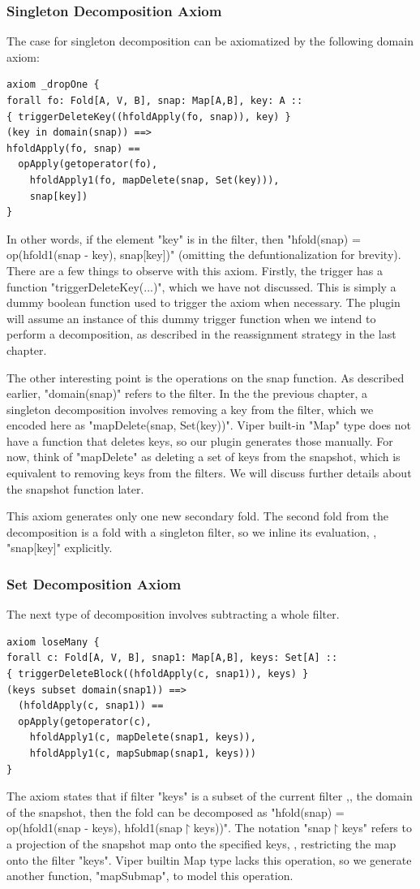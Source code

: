 \documentclass[msc,oneside]{ubcthesis}
\theoremstyle{definition}
\begin{document}
\subsubsection{Singleton Decomposition Axiom}
The case for singleton decomposition can be axiomatized by the following domain axiom:
\begin{lstlisting}[label=axm:drpone,caption=Decomposition By Removing 1 Element]
axiom _dropOne {
forall fo: Fold[A, V, B], snap: Map[A,B], key: A ::
{ triggerDeleteKey((hfoldApply(fo, snap)), key) }
(key in domain(snap)) ==>
hfoldApply(fo, snap) == 
  opApply(getoperator(fo), 
    hfoldApply1(fo, mapDelete(snap, Set(key))), 
    snap[key])
}
\end{lstlisting}
In other words, if the element "key" is in the filter, then "hfold(snap) = op(hfold1(snap - key), snap[key])" (omitting the defuntionalization for brevity). There are a few things to observe with this axiom. Firstly, the trigger has a function "triggerDeleteKey(...)", which we have not discussed. This is simply a dummy boolean function used to trigger the axiom when necessary. The plugin will assume an instance of this dummy trigger function when we intend to perform a decomposition, as described in the reassignment strategy in the last chapter.

The other interesting point is the operations on the snap function. As described earlier, "domain(snap)" refers to the filter. In the the previous chapter, a singleton decomposition involves removing a key from the filter, which we encoded here as "mapDelete(snap, Set(key))". Viper built-in "Map" type does not have a function that deletes keys, so our plugin generates those manually. For now, think of "mapDelete" as deleting a set of keys from the snapshot, which is equivalent to removing keys from the filters. We will discuss further details about the snapshot function later.

This axiom generates only one new secondary fold. The second fold from the decomposition is a fold with a singleton filter, so we inline its evaluation, \ie, "snap[key]" explicitly.

\subsubsection{Set Decomposition Axiom}
The next type of decomposition involves subtracting a whole filter.
\begin{lstlisting}
axiom loseMany {
forall c: Fold[A, V, B], snap1: Map[A,B], keys: Set[A] ::
{ triggerDeleteBlock((hfoldApply(c, snap1)), keys) }
(keys subset domain(snap1)) ==>
  (hfoldApply(c, snap1)) ==
  opApply(getoperator(c), 
    hfoldApply1(c, mapDelete(snap1, keys)),
    hfoldApply1(c, mapSubmap(snap1, keys)))
}
\end{lstlisting}
The axiom states that if filter "keys" is a subset of the current filter ,\ie, the domain of the snapshot, then the fold can be decomposed as "hfold(snap) = op(hfold1(snap - keys), hfold1(snap$\upharpoonright$keys))". The notation "snap$\upharpoonright$keys" refers to a projection of the snapshot map onto the specified keys, \ie, restricting the map onto the filter "keys". Viper builtin Map type lacks this operation, so we generate another function, "mapSubmap", to model this operation. 
\end{document}
